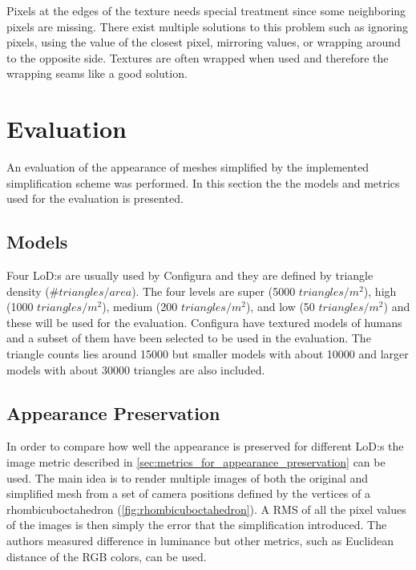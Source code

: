  Pixels at the edges of the texture needs special treatment since some neighboring pixels are missing. There exist multiple solutions to this problem such as ignoring pixels, using the value of the closest pixel, mirroring values, or wrapping around to the opposite side. Textures are often wrapped when used and therefore the wrapping seams like a good solution.

 
\clearpage

  


\section{Evaluation} \label{sec:evaluation}
An evaluation of the appearance of meshes simplified by the implemented simplification scheme was performed. In this section the the models and metrics used for the evaluation is presented.

\subsection{Models}
Four LoD:s are usually used by Configura and they are defined by triangle density ($\#triangles/area$). The four levels are super (5000 $triangles/m^2$), high (1000 $triangles/m^2$), medium (200 $triangles/m^2$), and low  (50 $triangles/m^2$) and these will be used for the evaluation. Configura have textured models of humans and a subset of them have been selected to be used in the evaluation. The triangle counts lies around 15000 but smaller models with about 10000 and larger models with about 30000 triangles are also included. 

\subsection{Appearance Preservation}
In order to compare how well the appearance is preserved for different LoD:s the image metric described in \cref{sec:metrics_for_appearance_preservation} can be used. The main idea is to render multiple images of both the original and simplified mesh from a set of camera positions defined by the vertices of a rhombicuboctahedron (\cref{fig:rhombicuboctahedron}). A RMS of all the pixel values of the images is then simply the error that the simplification introduced. The authors \cite{lindstrom2000image} measured difference in luminance but other metrics, such as Euclidean distance of the RGB colors, can be used.



